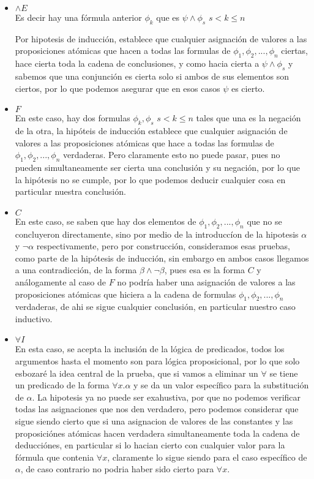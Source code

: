 \documentclass{article}
\begin{document}
\begin{enumerate}
\begin{itemize}
\item $\wedge E$\\
Es decir hay una fórmula anterior $\phi_k$ que es $\psi \wedge \phi_s$  $s < k \le n$

Por hipotesis de inducción, establece que cualquier asignación de valores a las proposiciones atómicas que hacen a todas las formulas de $\phi_1,\phi_2,...,\phi_n$ ciertas, hace cierta toda la cadena de conclusiones, y como hacia cierta a $\psi \wedge \phi_s$ y sabemos que una conjunción es cierta solo si ambos de sus elementos son ciertos, por lo que podemos asegurar que en esos casos $\psi$ es cierto.

\item $F$\\
En este caso, hay dos formulas $\phi_k,\phi_s$ $s < k \le n$ tales que una es la negación de la otra, la hipóteis de inducción establece que cualquier asignación de valores a las proposiciones atómicas que hace a todas las formulas de $\phi_1,\phi_2,...,\phi_n$ verdaderas.
Pero claramente esto no puede pasar, pues no pueden simultaneamente ser cierta una conclusión y su negación, por lo que la hipótesis no se cumple, por lo que podemos deducir cualquier cosa en particular nuestra conclusión.

\item $C$\\
En este caso, se saben que hay dos elementos de $\phi_1,\phi_2,...,\phi_n$ que no se concluyeron directamente, sino por medio de la introduccíon de la hipotesis $\alpha$ y $\neg \alpha$ respectivamente, pero por construcción, consideramos esas pruebas, como parte de la hipótesis de inducción, sin embargo en ambos casos llegamos a una contradicción, de la forma $\beta \wedge \neg \beta$, pues esa es la forma $C$ y análogamente al caso de $F$ no podría haber una asignación de valores a las proposiciones atómicas que hiciera a la cadena de formulas $\phi_1,\phi_2,...,\phi_n$ verdaderas, de ahi se sigue cualquier conclusión, en particular nuestro caso inductivo.

\item $\forall I$\\
En esta caso, se acepta la inclusión de la lógica de predicados, todos los argumentos hasta el momento son para lógica proposicional, por lo que solo esbozaré la idea central de la prueba, que si vamos a eliminar un $\forall$ se tiene un predicado de la forma $\forall x. \alpha$ y se da un valor específico para la substitución de $\alpha$. La hipotesis ya no puede ser exahustiva, por que no podemos verificar todas las asignaciones que nos den verdadero, pero podemos considerar que sigue siendo cierto que si una asignacion de valores de las constantes y las proposiciónes atómicas hacen verdadera simultaneamente toda la cadena de deducciónes, en particular si lo hacian cierto con cualquier valor para la fórmula que contenia $\forall x$, claramente lo sigue siendo para el caso específico de $\alpha$, de caso contrario no podria haber sido cierto para  $\forall x$.

\end{itemize}

\end{enumerate}
\end{document}
